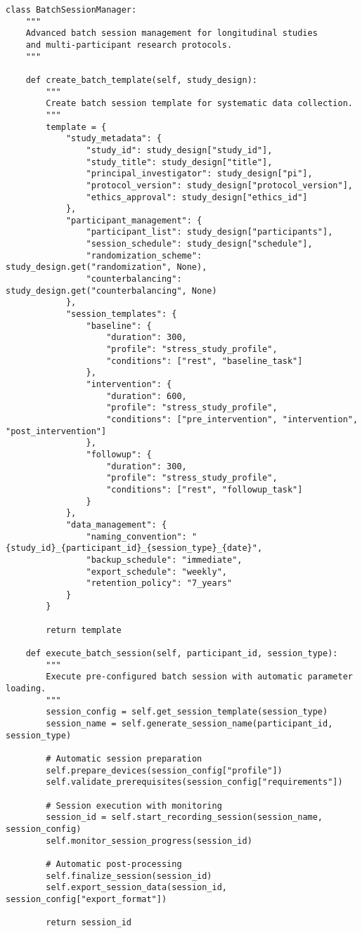 \documentclass[11pt,a4paper]{article}
\begin{document}
\begin{verbatim}
class BatchSessionManager:
    """
    Advanced batch session management for longitudinal studies
    and multi-participant research protocols.
    """

    def create_batch_template(self, study_design):
        """
        Create batch session template for systematic data collection.
        """
        template = {
            "study_metadata": {
                "study_id": study_design["study_id"],
                "study_title": study_design["title"],
                "principal_investigator": study_design["pi"],
                "protocol_version": study_design["protocol_version"],
                "ethics_approval": study_design["ethics_id"]
            },
            "participant_management": {
                "participant_list": study_design["participants"],
                "session_schedule": study_design["schedule"],
                "randomization_scheme": study_design.get("randomization", None),
                "counterbalancing": study_design.get("counterbalancing", None)
            },
            "session_templates": {
                "baseline": {
                    "duration": 300,
                    "profile": "stress_study_profile",
                    "conditions": ["rest", "baseline_task"]
                },
                "intervention": {
                    "duration": 600,
                    "profile": "stress_study_profile",
                    "conditions": ["pre_intervention", "intervention", "post_intervention"]
                },
                "followup": {
                    "duration": 300,
                    "profile": "stress_study_profile",
                    "conditions": ["rest", "followup_task"]
                }
            },
            "data_management": {
                "naming_convention": "{study_id}_{participant_id}_{session_type}_{date}",
                "backup_schedule": "immediate",
                "export_schedule": "weekly",
                "retention_policy": "7_years"
            }
        }

        return template

    def execute_batch_session(self, participant_id, session_type):
        """
        Execute pre-configured batch session with automatic parameter loading.
        """
        session_config = self.get_session_template(session_type)
        session_name = self.generate_session_name(participant_id, session_type)

        # Automatic session preparation
        self.prepare_devices(session_config["profile"])
        self.validate_prerequisites(session_config["requirements"])

        # Session execution with monitoring
        session_id = self.start_recording_session(session_name, session_config)
        self.monitor_session_progress(session_id)

        # Automatic post-processing
        self.finalize_session(session_id)
        self.export_session_data(session_id, session_config["export_format"])

        return session_id
\end{verbatim}
\end{document}
